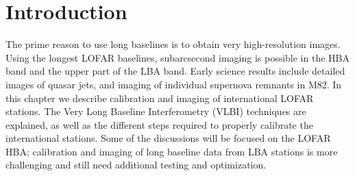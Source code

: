 \documentclass[graybox]{svmult}
\begin{document}

\section{Introduction}
\label{sec:introduction}

The prime reason to use long baselines is to obtain very high-resolution images.
Using the longest LOFAR baselines, subarcsecond imaging is possible in the HBA
band and the upper part of the LBA band. Early science results include 
detailed images of quasar jets, and imaging of individual supernova remnants
in M82. In this chapter we describe calibration and imaging of international LOFAR
stations. The Very Long Baseline Interferometry (VLBI) techniques are
explained, as well as the different steps required to properly calibrate the
international stations. Some of the discussions will be focused on the LOFAR
HBA; calibration and imaging of long baseline data from LBA stations is more
challenging and still need additional testing and optimization.
\end{document}
